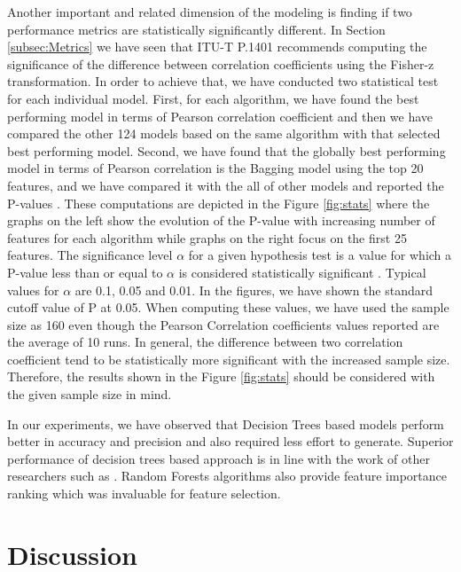 \documentclass[journal]{IEEEtran}
\begin{document}
Another important and related dimension of the modeling is finding if two performance metrics are statistically significantly different. In Section \ref{subsec:Metrics} we have seen that ITU-T P.1401 \cite{itut2012P.1401} recommends computing the significance of the difference between correlation coefficients using the  Fisher-z transformation. In order to achieve that, we have conducted two statistical test for each individual model. First, for each algorithm, we have found the best performing model in terms of Pearson correlation coefficient and then we have compared the other 124 models based on the same algorithm with that selected best performing model. Second, we have found that the globally best performing model in terms of Pearson correlation is the Bagging model using the top 20 features, and we have compared it with the all of other models and reported the P-values \cite{sellke2001calibration}. These computations are depicted in the Figure \ref{fig:stats} where the graphs on the left show the evolution of the P-value with increasing number of features for each algorithm while graphs on the right focus on the first 25 features. The significance level $\alpha$ for a given hypothesis test is a value for which a P-value less than or equal to $\alpha$ is considered statistically significant \cite{sellke2001calibration}. Typical values for $\alpha$ are 0.1, 0.05 and 0.01. In the figures, we have shown the standard cutoff value of P at 0.05. When computing these values, we have used the sample size as 160 even though the Pearson Correlation coefficients values reported are the average of 10 runs. In general, the difference between two correlation coefficient tend to be statistically more significant with the increased sample size. Therefore, the results shown in the Figure \ref{fig:stats} should be considered with the given sample size in mind.

In our experiments, we have observed that Decision Trees based models perform better in accuracy and precision and also required less effort to generate. Superior performance of decision trees based approach is in line with the work of other researchers such as \cite{hameed2016decision}. Random Forests algorithms also provide feature importance ranking which was invaluable for feature selection.

\vspace{-0.3cm}
\section{Discussion}
\end{document}
